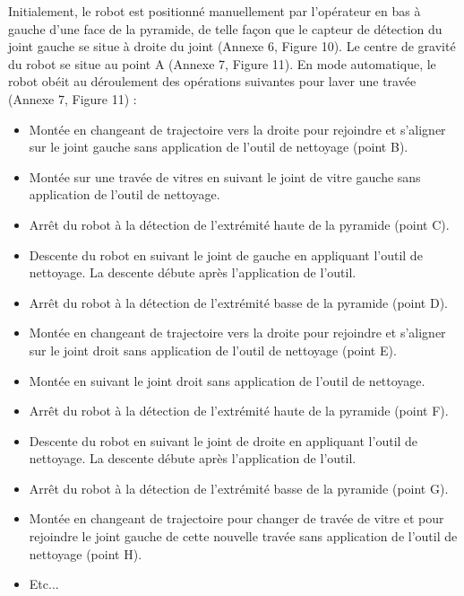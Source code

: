 Initialement, le robot est positionné manuellement par l'opérateur en bas à gauche d'une face de la pyramide, de telle façon que le capteur de détection du joint gauche se situe à droite du joint (Annexe 6, Figure 10). Le centre de gravité du robot se situe au point A (Annexe 7, Figure 11). En mode automatique, le robot obéit au déroulement des opérations suivantes pour laver une travée (Annexe 7, Figure 11) :
\begin{itemize}
 \item Montée en changeant de trajectoire vers la droite pour rejoindre et s'aligner sur le joint gauche sans application de l'outil de nettoyage (point B).
 \item Montée sur une travée de vitres en suivant le joint de vitre gauche sans application de l'outil de nettoyage.
 \item Arrêt du robot à la détection de l'extrémité haute de la pyramide (point C).
 \item Descente du robot en suivant le joint de gauche en appliquant l'outil de nettoyage. La descente débute après l'application de l'outil.
 \item Arrêt du robot à la détection de l'extrémité basse de la pyramide (point D).
 \item Montée en changeant de trajectoire vers la droite pour rejoindre et s'aligner sur le joint droit sans application de l'outil de nettoyage (point E).
 \item Montée en suivant le joint droit sans application de l'outil de nettoyage.
 \item Arrêt du robot à la détection de l'extrémité haute de la pyramide (point F).
 \item Descente du robot en suivant le joint de droite en appliquant l'outil de nettoyage. La descente débute après l'application de l'outil.
 \item Arrêt du robot à la détection de l'extrémité basse de la pyramide (point G).
 \item Montée en changeant de trajectoire pour changer de travée de vitre et pour rejoindre le joint gauche de cette nouvelle travée sans application de l'outil de nettoyage (point H).
 \item Etc...
\end{itemize}

